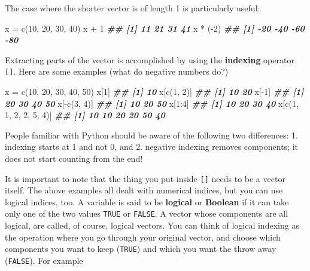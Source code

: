 \documentclass[
]{book}
\newenvironment{Shaded}{\begin{snugshade}}{\end{snugshade}}
\newcommand{\DecValTok}[1]{\textcolor[rgb]{0.00,0.00,0.81}{#1}}
\newcommand{\DocumentationTok}[1]{\textcolor[rgb]{0.56,0.35,0.01}{\textbf{\textit{#1}}}}
\newcommand{\FunctionTok}[1]{\textcolor[rgb]{0.00,0.00,0.00}{#1}}
\newcommand{\NormalTok}[1]{#1}
\newcommand{\OtherTok}[1]{\textcolor[rgb]{0.56,0.35,0.01}{#1}}
\newcommand{\SpecialCharTok}[1]{\textcolor[rgb]{0.00,0.00,0.00}{#1}}
\theoremstyle{definition}
\theoremstyle{definition}
\theoremstyle{definition}
\theoremstyle{definition}
\theoremstyle{remark}
\begin{document}
The case where the shorter vector is of length 1 is particularly useful:

\begin{Shaded}
\begin{Highlighting}[]
\NormalTok{x }\OtherTok{=} \FunctionTok{c}\NormalTok{(}\DecValTok{10}\NormalTok{, }\DecValTok{20}\NormalTok{, }\DecValTok{30}\NormalTok{, }\DecValTok{40}\NormalTok{)}
\NormalTok{x }\SpecialCharTok{+} \DecValTok{1}
\DocumentationTok{\#\# [1] 11 21 31 41}
\NormalTok{x }\SpecialCharTok{*}\NormalTok{ (}\SpecialCharTok{{-}}\DecValTok{2}\NormalTok{)}
\DocumentationTok{\#\# [1] {-}20 {-}40 {-}60 {-}80}
\end{Highlighting}
\end{Shaded}

Extracting parts of the vector is accomplished by using the \textbf{indexing} operator \texttt{{[}{]}}. Here are some examples (what do negative numbers do?)

\begin{Shaded}
\begin{Highlighting}[]
\NormalTok{x }\OtherTok{=} \FunctionTok{c}\NormalTok{(}\DecValTok{10}\NormalTok{, }\DecValTok{20}\NormalTok{, }\DecValTok{30}\NormalTok{, }\DecValTok{40}\NormalTok{, }\DecValTok{50}\NormalTok{)}
\NormalTok{x[}\DecValTok{1}\NormalTok{]}
\DocumentationTok{\#\# [1] 10}
\NormalTok{x[}\FunctionTok{c}\NormalTok{(}\DecValTok{1}\NormalTok{, }\DecValTok{2}\NormalTok{)]}
\DocumentationTok{\#\# [1] 10 20}
\NormalTok{x[}\SpecialCharTok{{-}}\DecValTok{1}\NormalTok{]}
\DocumentationTok{\#\# [1] 20 30 40 50}
\NormalTok{x[}\SpecialCharTok{{-}}\FunctionTok{c}\NormalTok{(}\DecValTok{3}\NormalTok{, }\DecValTok{4}\NormalTok{)]}
\DocumentationTok{\#\# [1] 10 20 50}
\NormalTok{x[}\DecValTok{1}\SpecialCharTok{:}\DecValTok{4}\NormalTok{]}
\DocumentationTok{\#\# [1] 10 20 30 40}
\NormalTok{x[}\FunctionTok{c}\NormalTok{(}\DecValTok{1}\NormalTok{, }\DecValTok{1}\NormalTok{, }\DecValTok{2}\NormalTok{, }\DecValTok{2}\NormalTok{, }\DecValTok{5}\NormalTok{, }\DecValTok{4}\NormalTok{)]}
\DocumentationTok{\#\# [1] 10 10 20 20 50 40}
\end{Highlighting}
\end{Shaded}

People familiar with Python should be aware of the following two differences: 1. indexing starts at 1 and not 0, and 2. negative indexing removes components; it does not start counting from the end!

It is important to note that the thing you put inside \texttt{{[}{]}} needs to be a vector itself. The above examples all dealt with numerical indices, but you can use logical indices, too. A variable is said to be \textbf{logical} or \textbf{Boolean} if it can take only one of the two values \texttt{TRUE} or \texttt{FALSE}. A vector whose components are all logical, are called, of course, logical vectors. You can think of logical indexing as the operation where you go through your original vector, and choose which components you want to keep (\texttt{TRUE}) and which you want the throw away (\texttt{FALSE}). For example
\end{document}
